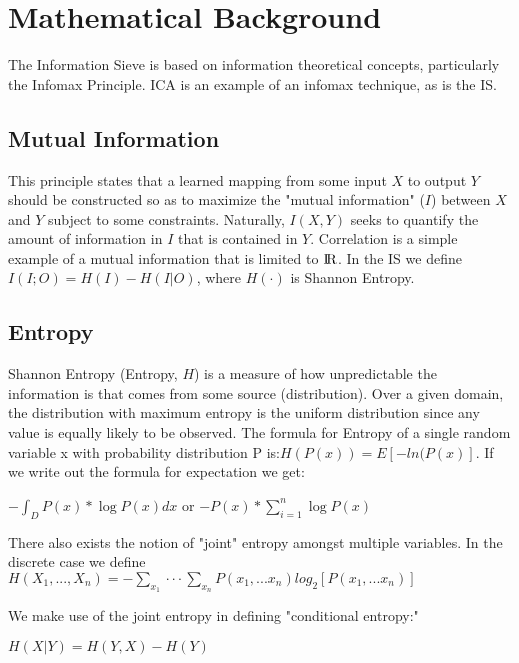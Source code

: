 \documentclass[12pt]{article}
\newenvironment{nscenter}
 {\parskip=0pt\par\nopagebreak\centering}
 {\par\noindent\ignorespacesafterend}
\begin{document}
\section{Mathematical Background}
The Information Sieve is based on information theoretical concepts, particularly the Infomax Principle. ICA is an example of an infomax technique, as is the IS.  


\subsection{Mutual Information}
This principle states that a learned mapping from some input $X$ to output $Y$ should be constructed so as to maximize the "mutual information" ($I$) between $X$ and $Y$ subject to some constraints. Naturally, $I(X,Y)$ seeks to quantify the amount of information in $I$ that is contained in $Y$. Correlation is a simple example of a mutual information that is limited to ${\rm I\!R}$. In the IS we define $I(I;O) = H(I) - H(I|O)$, where $H(\cdot)$ is Shannon Entropy.\newline

\subsection{Entropy}
Shannon Entropy (Entropy, $H$) is a measure of how unpredictable the information is that comes from some source (distribution). Over a given domain, the distribution with maximum entropy is the uniform distribution since any value is equally likely to be observed. The formula for Entropy of a single random variable x with probability distribution P is:$H(P(x)) = E[-ln(P(x)]$. If we write out the formula for expectation we get:\\
\begin{nscenter}$-\int_{D} P(x)*\log{P(x)}dx$  or  $ -P(x)*\sum_{i=1}^{n} \log{P(x)}$ 
\end{nscenter}
\newline
There also exists the notion of "joint" entropy amongst multiple variables. In the discrete case we define $H(X_{1},...,X_{n}) = -\sum_{x_{1}}\cdot\cdot\cdot\sum_{x_{n}}P(x_{1},...x_{n})log_{2}[P(x_{1},...x_{n})]$


We make use of the joint entropy in defining "conditional entropy:" \newline
\begin{nscenter}

$H(X|Y) = H(Y,X) - H(Y)$
\end{nscenter}
\end{document}
